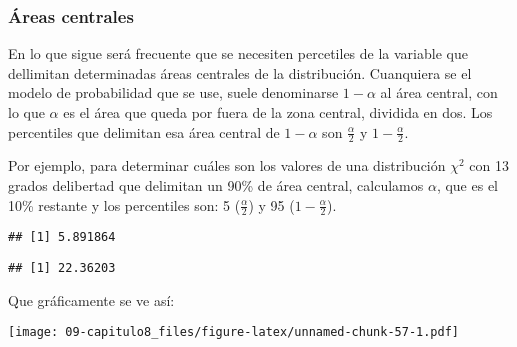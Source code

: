\documentclass[]{article}
\begin{document}
\hypertarget{uxe1reas-centrales}{%
\subsubsection{Áreas centrales}\label{uxe1reas-centrales}}

En lo que sigue será frecuente que se necesiten percetiles de la
variable que dellimitan determinadas áreas centrales de la distribución.
Cuanquiera se el modelo de probabilidad que se use, suele denominarse
\(1-\alpha\) al área central, con lo que \(\alpha\) es el área que queda
por fuera de la zona central, dividida en dos. Los percentiles que
delimitan esa área central de \(1-\alpha\) son \(\frac{\alpha}{2}\) y
\(1-\frac{\alpha}{2}\).

Por ejemplo, para determinar cuáles son los valores de una distribución
\(\chi^2\) con 13 grados delibertad que delimitan un 90\% de área
central, calculamos \(\alpha\), que es el 10\% restante y los
percentiles son: 5 (\(\frac{\alpha}{2}\)) y 95 (\(1-\frac{\alpha}{2}\)).

\begin{verbatim}
## [1] 5.891864
\end{verbatim}

\begin{verbatim}
## [1] 22.36203
\end{verbatim}

Que gráficamente se ve así:

\texttt{[image: 09-capitulo8\_files/figure-latex/unnamed-chunk-57-1.pdf]}
\end{document}
